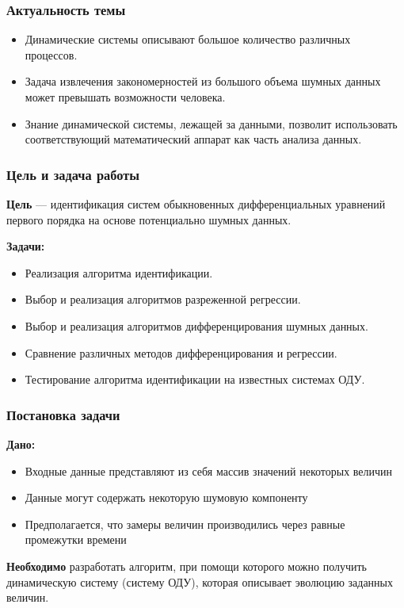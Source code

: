 \documentclass[pdf, hyperref={unicode}, aspectratio=169]{beamer}
\begin{document}
\frame{\titlepage}

\begin{frame}
\frametitle{Актуальность темы}

\begin{itemize}
  \item Динамические системы описывают большое количество различных процессов.
  \item Задача извлечения закономерностей из большого объема шумных данных может превышать возможности человека.
  \item Знание динамической системы, лежащей за данными, позволит использовать соответствующий математический аппарат как часть анализа данных.
\end{itemize}
\end{frame}


\begin{frame}
\frametitle{Цель и задача работы}

\textbf{Цель} --- идентификация систем обыкновенных дифференциальных уравнений первого порядка на основе потенциально шумных данных.

\textbf{Задачи:}
\begin{itemize}
  \item Реализация алгоритма идентификации.
  \item Выбор и реализация алгоритмов разреженной регрессии.
  \item Выбор и реализация алгоритмов дифференцирования шумных данных.
  \item Сравнение различных методов дифференцирования и регрессии.
  \item Тестирование алгоритма идентификации на известных системах ОДУ.
\end{itemize}
\end{frame}


\begin{frame}
\frametitle{Постановка задачи}

\textbf{Дано:}
\begin{itemize}
  \item Входные данные представляют из себя массив значений некоторых величин
  \item Данные могут содержать некоторую шумовую компоненту
  \item Предполагается, что замеры величин производились через равные промежутки времени
\end{itemize}

\textbf{Необходимо} разработать алгоритм, при помощи которого можно получить динамическую систему (систему ОДУ), которая описывает эволюцию заданных величин.
\end{frame}
\end{document}
